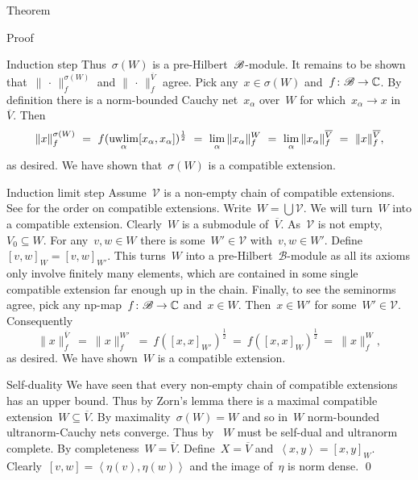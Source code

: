 \documentclass[b]{subfiles}
\begin{document}
\begin{parsec}
\begin{point}{Theorem}
\begin{point}{Proof}
\begin{point}{Induction step}
Thus~$\sigma(W)$ is a pre-Hilbert~$\mathscr{B}$-module.
It remains to be shown that~$\|\,\cdot\,\|_f^{\sigma(W)}$
    and $\|\,\cdot\,\|_f^{\overline{V}}$
    agree.
Pick any~$x \in \sigma(W)$ and~$f\colon \mathscr{B} \to \mathbb{C}$.
By definition there is a norm-bounded Cauchy net~$x_\alpha$ over~$W$
    for which~$x_\alpha \to x$ in~$\overline{V}$.
Then
\begin{equation*}
    \|x\|^{\sigma(W)}_f
       \ =\ f(\uwlim_\alpha [x_\alpha,x_\alpha])^{\frac{1}{2}}
       \ =\ \lim_\alpha \|x_\alpha\|_f^W
       \ =\ \lim_\alpha \|x_\alpha\|_f^{\overline{V}}
       \ =\ \|x\|_f^{\overline{V}},
\end{equation*}
as desired.
We have shown that~$\sigma(W)$ is a compatible extension.
\end{point}
\begin{point}{Induction limit step}%
    Assume~$\mathscr{V}$
        is a non-empty chain of compatible extensions.
        See  for the order on compatible extensions.
    Write~$W = \bigcup \mathscr{V}$.
    We will turn~$W$ into a compatible extension.
    Clearly~$W$ is a submodule of~$\overline{V}$.
    As~$\mathscr{V}$ is not empty, $V_0 \subseteq W$.
    For any~$v,w \in W$
    there is some~$W' \in \mathscr{V}$ with~$v,w \in W'$.
    Define~$[v,w]_W = [v,w]_{W'}$.
    This turns~$W$ into a pre-Hilbert~$\mathscr{B}$-module
        as all its axioms only involve finitely many elements,
        which are contained in some single compatible extension far enough up
        in the chain.
    Finally, to see the seminorms agree,
        pick any np-map~$f\colon \mathscr{B} \to \mathbb{C}$
        and~$x \in W$.
    Then~$x \in W'$ for some~$W' \in \mathscr{V}$.
    Consequently
    \begin{equation*}
        \|x\|^{\overline{V}}_f
        \ =\ \|x\|^{W'}_f
        \ =\ f([x,x]_{W'})^{\frac{1}{2}}
        \ =\ f([x,x]_{W})^{\frac{1}{2}}
        \ =\  \|x\|^{W}_f,
    \end{equation*}
    as desired.  We have shown~$W$ is a compatible extension.
\end{point}
\begin{point}{Self-duality}
    We have seen
    that every non-empty chain of compatible extensions
        has an upper bound.
    Thus by Zorn's lemma there is a maximal compatible
        extension~$W\subseteq \overline{V}$.
    By maximality~$\sigma(W) = W$
        and so in~$W$ norm-bounded ultranorm-Cauchy nets converge.
    Thus by~
        $W$ must be self-dual and ultranorm complete.
    By completeness~$W = \overline{V}$.
    Define~$X = \overline{V}$
        and~$\left<x,y\right> = [x,y]_{W}$.
    Clearly~$[v,w] = \left<\eta(v),\eta(w)\right>$
        and the image of~$\eta$ is norm dense. \qed
\end{point}
\end{point}
\end{point}
\end{parsec}
\end{document}
